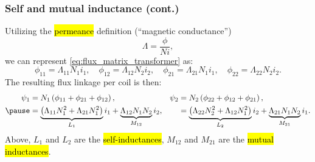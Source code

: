 \begin{frame}
	\frametitle{Self and mutual inductance (cont.)}
	Utilizing the \hl{permeance} definition (\enquote{magnetic conductance})
	\begin{equation}
		\Lambda = \frac{\phi}{N i},
	\end{equation}
	\pause
	we can represent \eqref{eq:flux_matrix_transformer} as:
	\begin{equation}
		\phi_{11} = \Lambda_{11} N_1 i_1, \quad \phi_{12} = \Lambda_{12} N_2 i_2, \quad \phi_{21} = \Lambda_{21} N_1 i_1, \quad \phi_{22} = \Lambda_{22} N_2 i_2.
	\end{equation}
	\pause
	The resulting flux linkage per coil is then:
	\begin{equation}
		\begin{alignedat}{3}
			\psi_1 & = N_1\left(\phi_{11} + \phi_{21} + \phi_{12}\right), \quad                                                                   &  & \psi_2 &  & =  N_2\left(\phi_{22} + \phi_{12} + \phi_{21}\right),                                                                  \\ \pause
			       & =\underbrace{\left(\Lambda_{11}N_1^2+\Lambda_{21}N_1^2\right)}_{L_1}i_1 + \underbrace{\Lambda_{12}N_1N_2}_{M_{12}}i_2, \quad &  &        &  & =\underbrace{\left(\Lambda_{22}N_2^2+\Lambda_{12}N_1^2\right)}_{L_2}i_2 + \underbrace{\Lambda_{21}N_1N_2}_{M_{21}}i_1.
		\end{alignedat}
		\label{eq:flux_linkage_transformer}
	\end{equation}
	Above, $L_1$ and $L_2$ are the \hl{self-inductances}, $M_{12}$ and $M_{21}$ are the \hl{mutual inductances}.
\end{frame}


